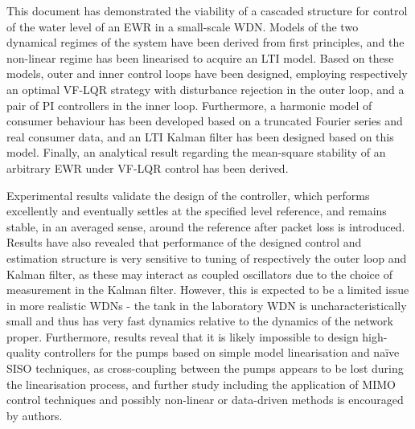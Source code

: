 This document has demonstrated the viability of a cascaded structure for control of the water level of an EWR in a small-scale WDN. Models of the two dynamical regimes of the system have been derived from first principles, and the non-linear regime has been linearised to acquire an LTI model. Based on these models, outer and inner control loops have been designed, employing respectively an optimal VF-LQR strategy with disturbance rejection in the outer loop, and a pair of PI controllers in the inner loop. Furthermore, a harmonic model of consumer behaviour has been developed based on a truncated Fourier series and real consumer data, and an LTI Kalman filter has been designed based on this model. Finally, an analytical result regarding the mean-square stability of an arbitrary EWR under VF-LQR control has been derived.

Experimental results validate the design of the controller, which performs excellently and eventually settles at the specified level reference, and remains stable, in an averaged sense, around the reference after packet loss is introduced. Results have also revealed that performance of the designed control and estimation structure is very sensitive to tuning of respectively the outer loop and Kalman filter, as these may interact as coupled oscillators due to the choice of measurement in the Kalman filter. However, this is expected to be a limited issue in more realistic WDNs - the tank in the laboratory WDN is uncharacteristically small and thus has very fast dynamics relative to the dynamics of the network proper. Furthermore, results reveal that it is likely impossible to design high-quality controllers for the pumps based on simple model linearisation and naïve SISO techniques, as cross-coupling between the pumps appears to be lost during the linearisation process, and further study including the application of MIMO control techniques and possibly non-linear or data-driven methods is encouraged by authors.